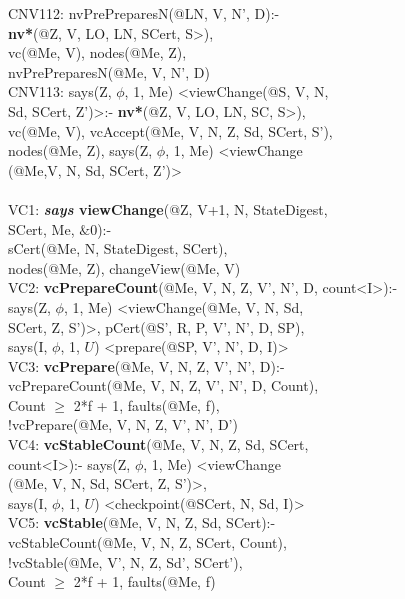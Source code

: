 \begin{code}
CNV112: nvPrePreparesN(@LN, V, N', D):-\\
\> \textbf{nv*}(@Z, V, LO, LN, SCert, S>),\\
\> vc(@Me, V), nodes(@Me, Z), \\
\> nvPrePreparesN(@Me, V, N', D)\\
CNV113: says(Z, $\phi$, 1, Me) <viewChange(@S, V, N, \\
\> Sd, SCert, Z')>:- \textbf{nv*}(@Z, V, LO, LN, SC, S>),\\
\> vc(@Me, V), vcAccept(@Me, V, N, Z, Sd, SCert, S'),\\
\> nodes(@Me, Z), says(Z, $\phi$, 1, Me) <viewChange \\
\> (@Me,V, N, Sd, SCert, Z')>\\
\\
VC1: \textbf{\textit{says} viewChange}(@Z, V+1, N, StateDigest, \\
\> SCert, Me, $\&0$):- \\
\> sCert(@Me, N, StateDigest, SCert), \\
\> nodes(@Me, Z), changeView(@Me, V)\\
VC2: \textbf{vcPrepareCount}(@Me, V, N, Z, V', N', D, count<I>):-\\
\> says(Z, $\phi$, 1, Me) <viewChange(@Me, V, N, Sd,  \\
\> SCert, Z, S')>, pCert(@S', R, P, V', N', D, SP),\\
\> says(I, $\phi$, 1, $U$) <prepare(@SP, V', N', D, I)>\\
VC3: \textbf{vcPrepare}(@Me, V, N, Z, V', N', D):-\\
\> vcPrepareCount(@Me, V, N, Z, V', N', D, Count),\\
\> Count $\geq$ 2*f + 1, faults(@Me, f),\\
\> !vcPrepare(@Me, V, N, Z, V', N', D')\\
VC4: \textbf{vcStableCount}(@Me, V, N, Z, Sd, SCert, \\
\> count<I>):- says(Z, $\phi$, 1, Me) <viewChange\\
\> (@Me, V, N, Sd, SCert, Z, S')>,\\
\> says(I, $\phi$, 1, $U$) <checkpoint(@SCert, N, Sd, I)>\\
VC5: \textbf{vcStable}(@Me, V, N, Z, Sd, SCert):-\\
\> vcStableCount(@Me, V, N, Z, SCert, Count),\\
\> !vcStable(@Me, V', N, Z, Sd', SCert'),\\
\> Count $\geq$ 2*f + 1, faults(@Me, f)\\

\end{code}
